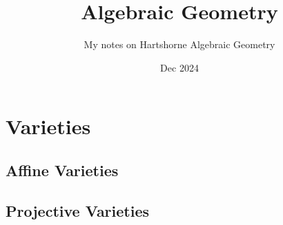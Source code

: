 \documentclass{book}
\title{Algebraic Geometry}
\author{My notes on Hartshorne Algebraic Geometry}
\date{Dec 2024}
\begin{document}
\maketitle

\chapter{Varieties}

\section{Affine Varieties}

\section{Projective Varieties}
\end{document}

